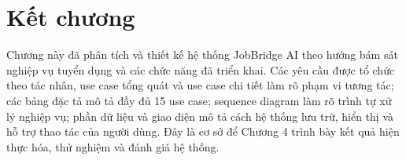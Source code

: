 \documentclass[../DoAn.tex]{subfiles}
\begin{document}
\section{Kết chương}

Chương này đã phân tích và thiết kế hệ thống JobBridge AI theo hướng bám sát nghiệp vụ tuyển dụng và các chức năng đã triển khai. Các yêu cầu được tổ chức theo tác nhân, use case tổng quát và use case chi tiết làm rõ phạm vi tương tác; các bảng đặc tả mô tả đầy đủ 15 use case; sequence diagram làm rõ trình tự xử lý nghiệp vụ; phần dữ liệu và giao diện mô tả cách hệ thống lưu trữ, hiển thị và hỗ trợ thao tác của người dùng. Đây là cơ sở để Chương 4 trình bày kết quả hiện thực hóa, thử nghiệm và đánh giá hệ thống.
\end{document}
